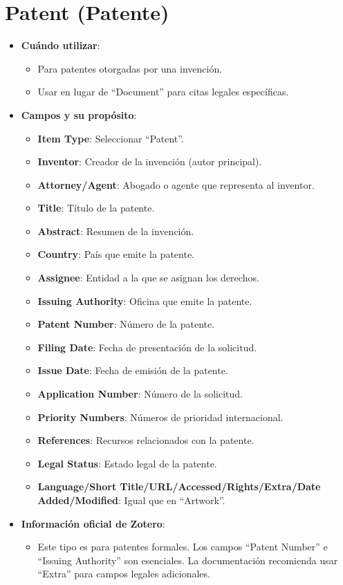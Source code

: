 \documentclass[
  jou,
  floatsintext,
  longtable,
  a4paper,
  nolmodern,
  notxfonts,
  notimes,
  12pt,
  colorlinks=true,linkcolor=blue,citecolor=blue,urlcolor=blue]{apa7}
\providecommand{\tightlist}{%
  \setlength{\itemsep}{0pt}\setlength{\parskip}{0pt}}
\begin{document}
\section{Patent (Patente)}\label{patent-patente}

\begin{itemize}
\tightlist
\item
  \textbf{Cuándo utilizar}:

  \begin{itemize}
  \tightlist
  \item
    Para patentes otorgadas por una invención.
  \item
    Usar en lugar de ``Document'' para citas legales específicas.
  \end{itemize}
\item
  \textbf{Campos y su propósito}:

  \begin{itemize}
  \tightlist
  \item
    \textbf{Item Type}: Seleccionar ``Patent''.
  \item
    \textbf{Inventor}: Creador de la invención (autor principal).
  \item
    \textbf{Attorney/Agent}: Abogado o agente que representa al
    inventor.
  \item
    \textbf{Title}: Título de la patente.
  \item
    \textbf{Abstract}: Resumen de la invención.
  \item
    \textbf{Country}: País que emite la patente.
  \item
    \textbf{Assignee}: Entidad a la que se asignan los derechos.
  \item
    \textbf{Issuing Authority}: Oficina que emite la patente.
  \item
    \textbf{Patent Number}: Número de la patente.
  \item
    \textbf{Filing Date}: Fecha de presentación de la solicitud.
  \item
    \textbf{Issue Date}: Fecha de emisión de la patente.
  \item
    \textbf{Application Number}: Número de la solicitud.
  \item
    \textbf{Priority Numbers}: Números de prioridad internacional.
  \item
    \textbf{References}: Recursos relacionados con la patente.
  \item
    \textbf{Legal Status}: Estado legal de la patente.
  \item
    \textbf{Language/Short Title/URL/Accessed/Rights/Extra/Date
    Added/Modified}: Igual que en ``Artwork''.
  \end{itemize}
\item
  \textbf{Información oficial de Zotero}:

  \begin{itemize}
  \tightlist
  \item
    Este tipo es para patentes formales. Los campos ``Patent Number'' e
    ``Issuing Authority'' son esenciales. La documentación recomienda
    usar ``Extra'' para campos legales adicionales.
  \end{itemize}
\end{itemize}
\end{document}
